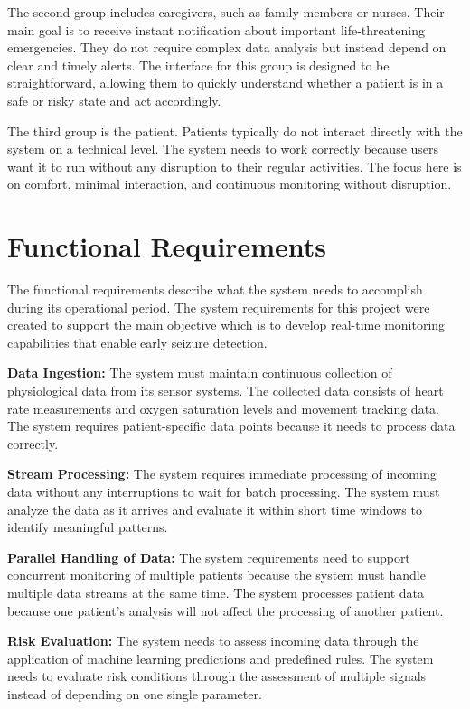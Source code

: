 \documentclass[12pt, a4paper, oneside]{report}
\begin{document}
The second group includes caregivers, such as family members or nurses. Their main goal is to receive instant notification about important life-threatening emergencies. They do not require complex data analysis but instead depend on clear and timely alerts. The interface for this group is designed to be straightforward, allowing them to quickly understand whether a patient is in a safe or risky state and act accordingly.

The third group is the patient. Patients typically do not interact directly with the system on a technical level. The system needs to work correctly because users want it to run without any disruption to their regular activities. The focus here is on comfort, minimal interaction, and continuous monitoring without disruption.

\section{Functional Requirements}

The functional requirements describe what the system needs to accomplish during its operational period. The system requirements for this project were created to support the main objective which is to develop real-time monitoring capabilities that enable early seizure detection.

\textbf{Data Ingestion:}  
The system must maintain continuous collection of physiological data from its sensor systems. The collected data consists of heart rate measurements and oxygen saturation levels and movement tracking data. The system requires patient-specific data points because it needs to process data correctly.

\textbf{Stream Processing:}  
The system requires immediate processing of incoming data without any interruptions to wait for batch processing. The system must analyze the data as it arrives and evaluate it within short time windows to identify meaningful patterns.

\textbf{Parallel Handling of Data:}  
The system requirements need to support concurrent monitoring of multiple patients because the system must handle multiple data streams at the same time. The system processes patient data because one patient's analysis will not affect the processing of another patient.

\textbf{Risk Evaluation:}  
The system needs to assess incoming data through the application of machine learning predictions and predefined rules. The system needs to evaluate risk conditions through the assessment of multiple signals instead of depending on one single parameter.
\end{document}
